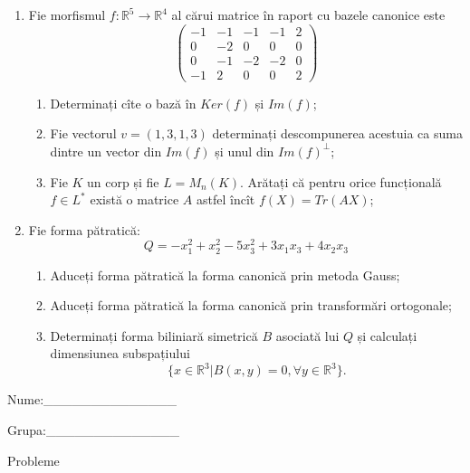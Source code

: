 \documentclass{article}
\begin{document}
\begin{enumerate}
 \item Fie morfismul $f:\mathbb{R}^5 \to \mathbb{R}^4$ al cărui matrice în raport cu bazele canonice este
$$\begin{pmatrix}
-1&-1&-1&-1&2\\
0&-2&0&0&0\\
0&-1&-2&-2&0\\
-1&2&0&0&2
\end{pmatrix}$$

\begin{enumerate}
\item Determinați cîte o bază în $Ker(f)$ și $Im(f)$;
\item Fie vectorul $v=(1,3,1,3)$ determinați descompunerea acestuia ca suma dintre un vector din $Im(f)$ și unul din $Im(f)^\perp$;
\item Fie $K$ un corp și fie $L=M_n(K)$. Arătați că pentru orice funcțională $f \in L^*$ există o matrice $A$ astfel încît $f(X)=Tr(AX)$;
\end{enumerate}
\item Fie forma pătratică:
$$Q= -x_1^2+x_2^2-5x_3^2+3x_1x_3+4x_2x_3$$

\begin{enumerate}
\item Aduceți forma pătratică la forma canonică prin metoda Gauss;
\item Aduceți forma pătratică la forma canonică prin transformări ortogonale;
\item Determinați forma biliniară simetrică $B$ asociată lui $Q$ și calculați dimensiunea subspațiului
$$\{x \in \mathbb{R}^3 | B(x,y)=0,\forall y \in \mathbb{R}^3\}.$$

\end{enumerate}
\end{enumerate}
\newpage
\begin{flushright}
Nume:\_\_\_\_\_\_\_\_\_\_\_\_\_\_
 
 
Grupa:\_\_\_\_\_\_\_\_\_\_\_\_\_\_
\end{flushright}
\begin{center}
\vspace{2cm}
{\Large Probleme}
\vspace{2cm}
\end{center}
\end{document}

